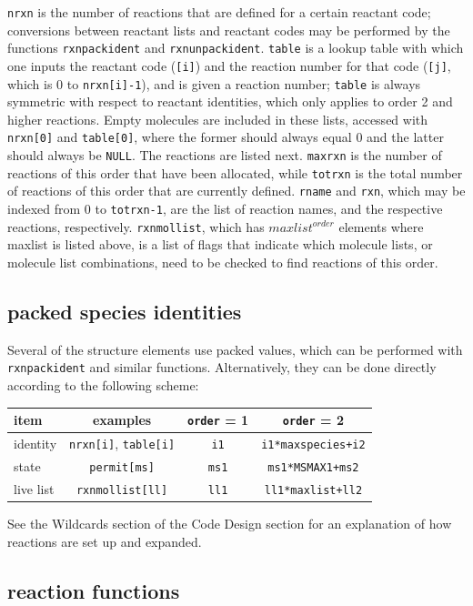 \documentclass {scrbook}
\newcommand {\ttt} {\texttt}
\begin{document}
\ttt{nrxn} is the number of reactions that are defined for a certain reactant code; conversions between reactant lists and reactant codes may be performed by the functions \ttt{rxnpackident} and \ttt{rxnunpackident}. \ttt{table} is a lookup table with which one inputs the reactant code (\ttt{[i]}) and the reaction number for that code (\ttt{[j]}, which is 0 to \ttt{nrxn[i]-1}), and is given a reaction number; \ttt{table} is always symmetric with respect to reactant identities, which only applies to order 2 and higher reactions. Empty molecules are included in these lists, accessed with \ttt{nrxn[0]} and \ttt{table[0]}, where the former should always equal 0 and the latter should always be \ttt{NULL}. The reactions are listed next. \ttt{maxrxn} is the number of reactions of this order that have been allocated, while \ttt{totrxn} is the total number of reactions of this order that are currently defined. \ttt{rname} and \ttt{rxn}, which may be indexed from 0 to \ttt{totrxn-1}, are the list of reaction names, and the respective reactions, respectively. \ttt{rxnmollist}, which has $maxlist^{order}$ elements where maxlist is listed above, is a list of flags that indicate which molecule lists, or molecule list combinations, need to be checked to find reactions of this order.

\subsection{packed species identities}

Several of the structure elements use packed values, which can be performed with \ttt{rxnpackident} and similar functions. Alternatively, they can be done directly according to the following scheme:

\begin{longtable}[c]{lccc}
item & examples & \ttt{order} = 1 & \ttt{order} = 2\\
\hline
identity & \ttt{nrxn[i]}, \ttt{table[i]} & \ttt{i1} & \ttt{i1*maxspecies+i2}\\
state & \ttt{permit[ms]} & \ttt{ms1} & \ttt{ms1*MSMAX1+ms2}\\
live list & \ttt{rxnmollist[ll]} & \ttt{ll1} & \ttt{ll1*maxlist+ll2}\\
\end{longtable}

See the Wildcards section of the Code Design section for an explanation of how reactions are set up and expanded.

\subsection{reaction functions}
\end{document}
